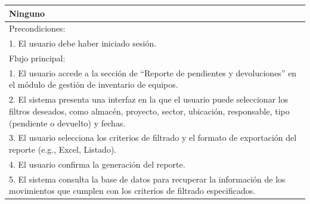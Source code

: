 \documentclass[stu, 12pt, letterpaper, donotrepeattitle, floatsintext, natbib]{apa7}
\begin{document}
\begin{longtable}{@{} p{16.5cm} @{}}
    Ninguno                                                                                                                                                                                                                                                                        \\ \midrule
    Precondiciones:                                                                                                                                                                                                                                                                \\
    1. El usuario debe haber iniciado sesión.                                                                                                                                                                                                                                      \\ \midrule
    Flujo principal:                                                                                                                                                                                                                                                               \\
    1. El usuario accede a la sección de ``Reporte de pendientes y devoluciones'' en el módulo de gestión de inventario de equipos.                                                                                                                                                \\
    2. El sistema presenta una interfaz en la que el usuario puede seleccionar los filtros deseados, como almacén, proyecto, sector, ubicación, responsable, tipo (pendiente o devuelto) y fechas.                                                                                 \\
    3. El usuario selecciona los criterios de filtrado y el formato de exportación del reporte (e.g., Excel, Listado).                                                                                                                                                             \\
    4. El usuario confirma la generación del reporte.                                                                                                                                                                                                                              \\
    5. El sistema consulta la base de datos para recuperar la información de los movimientos que cumplen con los criterios de filtrado especificados.                                                                                                                              \\

\end{longtable}
\end{document}
